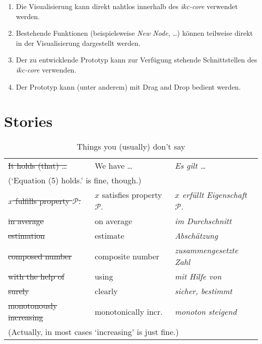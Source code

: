 \begin{enumerate}
    \item Die Visualisierung kann direkt nahtlos innerhalb des \textit{ikc-core} verwendet werden.
    \item Bestehende Funktionen (beispielsweise \textit{New Node}, \ldots) können teilweise direkt in der Visualisierung dargestellt werden.
    \item Der zu entwicklende Prototyp kann zur Verfügung stehende Schnittstellen des \textit{ikc-core} verwenden.
    \item Der Prototyp kann (unter anderem) mit Drag and Drop bedient werden.
\end{enumerate}


\section{Stories}

\begin{table}
  \centering
  \caption{Things you (usually) don't say}
  \label{tab:things-you-dont-say}
  \begin{tabular}{lll}
    \toprule
    \st{It holds (that) \dots} & We have \dots & \emph{Es gilt \dots}\\
    \multicolumn{3}{l}{\quad\footnotesize(`Equation (5) holds.' is fine, though.)}\\
    \st{$x$ fulfills property $\mathcal{P}$.}& \(x\) satisfies property \(\mathcal{P}\). & \emph{\(x\) erfüllt Eigenschaft \(\mathcal{P}\).} \\
    \st{in average} & on average & \emph{im Durchschnitt}\\
    \st{estimation} & estimate   & \emph{Abschätzung}\\
    \st{composed number} & composite number & \emph{zusammengesetzte Zahl}\\
    \st{with the help of} & using & \emph{mit Hilfe von}\\
    \st{surely} & clearly & \emph{sicher, bestimmt}\\
    \st{monotonously increasing} & monotonically incr. & \emph{monoton steigend}\\
    \multicolumn{3}{l}{\quad\footnotesize(Actually, in most cases `increasing' is just fine.)}\\
    \bottomrule
  \end{tabular}
\end{table}
